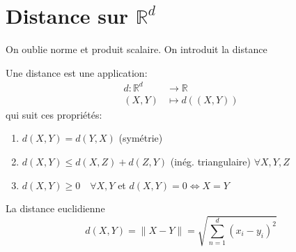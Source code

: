 \documentclass[a4paper]{report}
\newcommand\R{\ensuremath{\mathbb{R}}}
\let\iff\Leftrightarrow
\theoremstyle{definition}
\begin{document}
\section{Distance sur $\R^d$}
On oublie norme et produit scalaire. On introduit la distance
\begin{definition}\label{def:distance} Une distance est une application:
    \begin{align*}
        d: \R^d &\longrightarrow \R \\
        (X, Y) &\longmapsto d((X, Y)) 
    \end{align*}
    qui suit ces propriétés:
    \begin{enumerate}
        \item $d(X, Y) = d(Y, X)$ (symétrie)
        \item $d(X, Y) \le d(X, Z) + d(Z, Y)$ (inég. triangulaire) $\forall X, Y, Z$ 
        \item $d(X, Y) \ge 0 \quad \forall X, Y$ et $d(X, Y) = 0 \iff X = Y$ 
    \end{enumerate}
\end{definition}
\begin{definition} La distance euclidienne
    \[
        d(X, Y) = \|X - Y\| = \sqrt{\sum_{n=1}^{d} (x_i - y_i)^2} 
    \] 
\end{definition}
\end{document}
